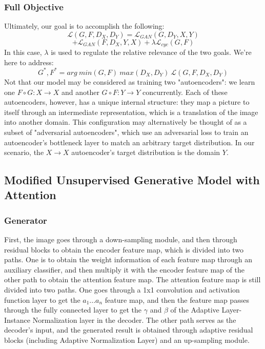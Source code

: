 \documentclass{article}
\begin{document}
\subsubsection{Full Objective}
Ultimately, our goal is to accomplish the following:
$$\mathcal{L}(G, F, D_X, D_Y) = \mathcal{L}_{GAN}(G, D_Y, X, Y)$$
$$+ \mathcal{L}_{GAN}(F, D_X, Y, X) +\lambda\mathcal{L}_{cyc}(G, F)$$
In this case, $\lambda$ is used to regulate the relative relevance of the two goals. We're here to address:
$$G^*, F^* = arg \ min(G, F) \ max(D_X, D_Y) \ \mathcal{L}(G, F, D_X, D_Y)$$
Not that our model may be considered as training two "autoencoders"\cite{Autoencoders}: we learn one $F \circ G: X \rightarrow X$ and another $G \circ F: Y \rightarrow Y$ concurrently. Each of these autoencoders, however, has a unique internal structure: they map a picture to itself through an intermediate representation, which is a translation of the image into another domain. This configuration may alternatively be thought of as a subset of "adversarial autoencoders"\cite{AA}, which use an adversarial loss to train an autoencoder's bottleneck layer to match an arbitrary target distribution. In our scenario, the $X \rightarrow X$ autoencoder's target distribution is the domain $Y$.

\subsection{Modified Unsupervised Generative Model with Attention}

\subsubsection{Generator}
First, the image goes through a down-sampling module, and then through residual blocks to obtain the encoder feature map, which is divided into two paths. One is to obtain the weight information of each feature map through an auxiliary classifier, and then multiply it with the encoder feature map of the other path to obtain the attention feature map. The attention feature map is still divided into two paths. One goes through a 1x1 convolution and activation function layer to get the $a_1...a_n$ feature map, and then the feature map passes through the fully connected layer to get the $\gamma$ and $\beta$ of the Adaptive Layer-Instance Normalization layer in the decoder. The other path serves as the decoder's input, and the generated result is obtained through adaptive residual blocks (including Adaptive Normalization Layer) and an up-sampling module.
\end{document}
